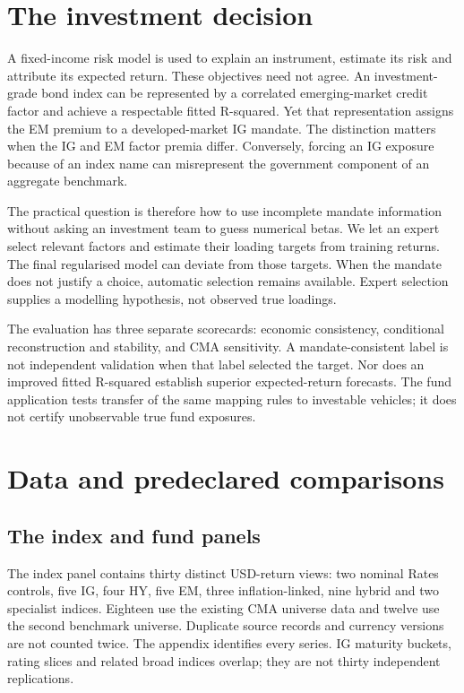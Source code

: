 \documentclass[a4paper,review]{cas-sc}
\begin{document}
\section{The investment decision}

A fixed-income risk model is used to explain an instrument, estimate its risk and attribute its expected return. These objectives need not agree. An investment-grade bond index can be represented by a correlated emerging-market credit factor and achieve a respectable fitted R-squared. Yet that representation assigns the EM premium to a developed-market IG mandate. The distinction matters when the IG and EM factor premia differ. Conversely, forcing an IG exposure because of an index name can misrepresent the government component of an aggregate benchmark.

The practical question is therefore how to use incomplete mandate information without asking an investment team to guess numerical betas. We let an expert select relevant factors and estimate their loading targets from training returns. The final regularised model can deviate from those targets. When the mandate does not justify a choice, automatic selection remains available. Expert selection supplies a modelling hypothesis, not observed true loadings.

The evaluation has three separate scorecards: economic consistency, conditional reconstruction and stability, and CMA sensitivity. A mandate-consistent label is not independent validation when that label selected the target. Nor does an improved fitted R-squared establish superior expected-return forecasts. The fund application tests transfer of the same mapping rules to investable vehicles; it does not certify unobservable true fund exposures.

\section{Data and predeclared comparisons}

\subsection{The index and fund panels}

The index panel contains thirty distinct USD-return views: two nominal Rates controls, five IG, four HY, five EM, three inflation-linked, nine hybrid and two specialist indices. Eighteen use the existing CMA universe data and twelve use the second benchmark universe. Duplicate source records and currency versions are not counted twice. The appendix identifies every series. IG maturity buckets, rating slices and related broad indices overlap; they are not thirty independent replications.
\end{document}
